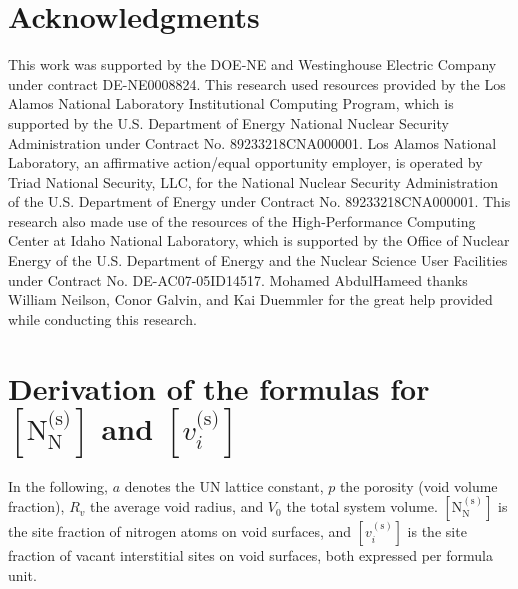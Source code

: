 \documentclass[preprint,12pt,sort&compress]{elsarticle}
\newcommand{\?}{\stackrel{?}{=}}
\begin{document}
\section{Acknowledgments}

This work was supported by the DOE-NE and Westinghouse Electric Company under contract DE-NE0008824. This research used resources provided by the Los Alamos National Laboratory Institutional Computing Program, which is supported by the U.S. Department of Energy National Nuclear Security Administration under Contract No. 89233218CNA000001. Los Alamos National Laboratory, an affirmative action/equal opportunity employer, is operated by Triad National Security, LLC, for the National Nuclear Security Administration of the U.S. Department of Energy under Contract No. 89233218CNA000001. This research also made use of the resources of the High-Performance Computing Center at Idaho National Laboratory, which is supported by the Office of Nuclear Energy of the U.S. Department of Energy and the Nuclear Science User Facilities under Contract No. DE-AC07-05ID14517. Mohamed AbdulHameed thanks William Neilson, Conor Galvin, and Kai Duemmler for the great help provided while conducting this research.

\appendix

\section{Derivation of the formulas for $[ \text{N}_\text{N}^\text{(s)} ]$ and $[ v_i^\text{(s)} ]$}
\label{App1}

In the following, $a$ denotes the UN lattice constant, $p$ the porosity (void volume fraction), $R_v$ the average void radius, and $V_0$ the total system volume. $[\text{N}_\text{N}^{(\text{s})}]$ is the site fraction of nitrogen atoms on void surfaces, and $[v_i^{(\text{s})}]$ is the site fraction of vacant interstitial sites on void surfaces, both expressed per formula unit.
\end{document}
